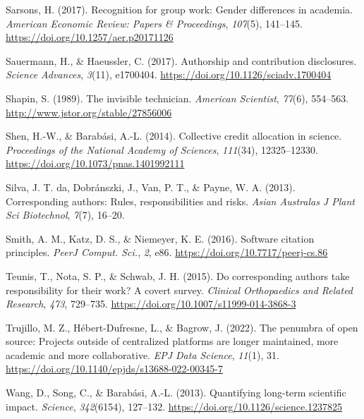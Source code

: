 \documentclass[
  number,
  3p,
  onecolumn]{elsarticle}
\newlength{\cslhangindent}
\newenvironment{CSLReferences}[2] %
 {\begin{list}{}{%
  \setlength{\itemindent}{0pt}
  \setlength{\leftmargin}{0pt}
  \setlength{\parsep}{0pt}
  \ifodd #1
   \setlength{\leftmargin}{\cslhangindent}
   \setlength{\itemindent}{-1\cslhangindent}
  \fi
  \setlength{\itemsep}{#2\baselineskip}}}
 {\end{list}}
\begin{document}
\begin{CSLReferences}{1}{0}
Sarsons, H. (2017). Recognition for group work: Gender differences in
academia. \emph{American Economic Review: Papers \& Proceedings},
\emph{107}(5), 141--145. \url{https://doi.org/10.1257/aer.p20171126}

Sauermann, H., \& Haeussler, C. (2017). Authorship and contribution
disclosures. \emph{Science Advances}, \emph{3}(11), e1700404.
\url{https://doi.org/10.1126/sciadv.1700404}

Shapin, S. (1989). The invisible technician. \emph{American Scientist},
\emph{77}(6), 554--563. \url{http://www.jstor.org/stable/27856006}

Shen, H.-W., \& Barabási, A.-L. (2014). Collective credit allocation in
science. \emph{Proceedings of the National Academy of Sciences},
\emph{111}(34), 12325--12330.
\url{https://doi.org/10.1073/pnas.1401992111}

Silva, J. T. da, Dobránszki, J., Van, P. T., \& Payne, W. A. (2013).
Corresponding authors: Rules, responsibilities and risks. \emph{Asian
Australas J Plant Sci Biotechnol}, \emph{7}(7), 16--20.

Smith, A. M., Katz, D. S., \& Niemeyer, K. E. (2016). Software citation
principles. \emph{PeerJ Comput. Sci.}, \emph{2}, e86.
\url{https://doi.org/10.7717/peerj-cs.86}

Teunis, T., Nota, S. P., \& Schwab, J. H. (2015). Do corresponding
authors take responsibility for their work? A covert survey.
\emph{Clinical Orthopaedics and Related Research{\textregistered}},
\emph{473}, 729--735. \url{https://doi.org/10.1007/s11999-014-3868-3}

Trujillo, M. Z., Hébert-Dufresne, L., \& Bagrow, J. (2022). The penumbra
of open source: Projects outside of centralized platforms are longer
maintained, more academic and more collaborative. \emph{EPJ Data
Science}, \emph{11}(1), 31.
\url{https://doi.org/10.1140/epjds/s13688-022-00345-7}

Wang, D., Song, C., \& Barabási, A.-L. (2013). Quantifying long-term
scientific impact. \emph{Science}, \emph{342}(6154), 127--132.
\url{https://doi.org/10.1126/science.1237825}


\end{CSLReferences}
\end{document}
